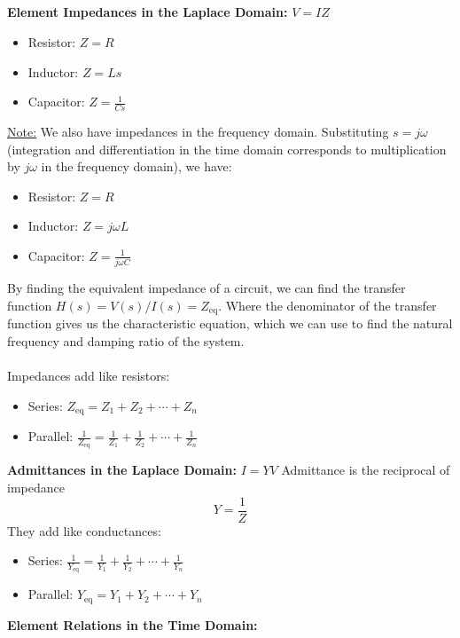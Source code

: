 \documentclass[12pt]{article}
\title{}
\date{}
\author{}
\begin{document}
\subsection*{}
\textbf{Element Impedances in the Laplace Domain:} $V=IZ$
\begin{itemize}
    \item Resistor: $Z=R$
    \item Inductor: $Z=Ls$
    \item Capacitor: $Z=\frac{1}{Cs}$
\end{itemize}
\underline{Note:} We also have impedances in the frequency domain. Substituting $s = j\omega$ (integration and differentiation in the time domain corresponds to multiplication by $j\omega$ in the frequency domain), we have:
\begin{itemize}
    \item Resistor: $Z=R$
    \item Inductor: $Z=j\omega L$
    \item Capacitor: $Z=\frac{1}{j\omega C}$
\end{itemize}
By finding the equivalent impedance of a circuit, we can find the transfer function $H(s) = V(s)/I(s) = Z_\text{eq}$. Where the denominator of the transfer function gives us the characteristic equation, which we can use to find the natural frequency and damping ratio of the system.\\\\
Impedances add like resistors:
\begin{itemize}
    \item Series: $Z_\text{eq} = Z_1 + Z_2 + \cdots + Z_n$
    \item Parallel: $\frac{1}{Z_\text{eq}} = \frac{1}{Z_1} + \frac{1}{Z_2} + \cdots + \frac{1}{Z_n}$
\end{itemize}
\textbf{Admittances in the Laplace Domain:} $I = YV$
Admittance is the reciprocal of impedance
\[Y = \frac{1}{Z}\]
They add like conductances:
\begin{itemize}
    \item Series: $\frac{1}{Y_\text{eq}} = \frac{1}{Y_1} + \frac{1}{Y_2} + \cdots + \frac{1}{Y_n}$
    \item Parallel: $Y_\text{eq} = Y_1 + Y_2 + \cdots + Y_n$
\end{itemize}
\newpage\noindent
\textbf{Element Relations in the Time Domain:}
\end{document}
